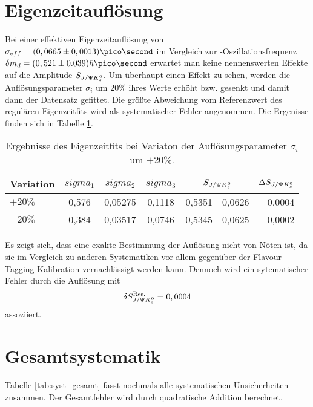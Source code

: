 \section{Eigenzeitauflösung} \label{kap:aufloesung}
Bei einer effektiven Eigenzeitauflösung von $\sigma_{eff} = (0,0665 \pm 0,0013)\ps$ im Vergleich zur \Bd-Oszillationsfrequenz $\delta m_d = (0,521 \pm 0.039)\hbar\ps$ erwartet man keine nennenswerten Effekte auf die Amplitude $S_{J/\Psi K_s^0}$. Um überhaupt einen Effekt zu sehen, werden die Auflösungsparameter $\sigma_i$ um 20\% ihres Werte erhöht bzw. gesenkt und damit dann der Datensatz gefittet. Die größte Abweichung vom Referenzwert des regulären Eigenzeitfits wird als systematischer Fehler angenommen. Die Ergenisse finden sich in Tabelle \ref{tab:syst_resolution}.

\begin{table}[hptb]
\centering
\caption{Ergebnisse des Eigenzeitfits bei Variaton der Auflösungsparameter $\sigma_i$ um $\pm 20\%$.}
\label{tab:syst_resolution}
\begin{tabular}{l c c c r@{$\pm$}l r }
\hline \hline
Variation & $sigma_1$ & $sigma_2$ & $sigma_3$ & \multicolumn{2}{c}{$S_{J/\Psi K_s^0}$} & $\Delta S_{J/\Psi K_s^0}$ \\ \hline
$+20\%$ & 0,576 & 0,05275 & 0,1118 & 0,5351 & 0,0626 & 0,0004 \\
$-20\%$ & 0,384 & 0,03517 & 0,0746 & 0,5345 & 0,0625 & -0,0002 \\ \hline \hline
\end{tabular}
\end{table}

Es zeigt sich, dass eine exakte Bestimmung der Auflösung nicht von Nöten ist, da sie im Vergleich zu anderen Systematiken vor allem gegenüber der Flavour-Tagging Kalibration vernachlässigt werden kann. Dennoch wird ein sytematischer Fehler durch die Auflösung mit
\begin{align}
\delta S_{J/\Psi K_s^0}^{\text{Res.}} = 0,0004
\end{align}
assoziiert.

\section{Gesamtsystematik}
Tabelle \ref{tab:syst_gesamt} fasst nochmals alle systematischen Unsicherheiten zusammen. Der Gesamtfehler wird durch quadratische Addition berechnet.

